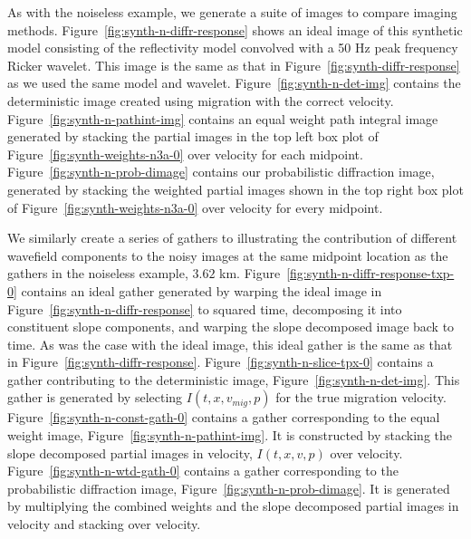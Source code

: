 As with the noiseless example, we generate a suite of images to compare imaging methods.  Figure~\ref{fig:synth-n-diffr-response} shows an ideal image of this synthetic model consisting of the reflectivity model convolved with a 50 Hz peak frequency Ricker wavelet.  This image is the same as that in Figure~\ref{fig:synth-diffr-response} as we used the same model and wavelet.  Figure~\ref{fig:synth-n-det-img} contains the deterministic image created using migration with the correct velocity. Figure~\ref{fig:synth-n-pathint-img} contains  an equal weight path integral image generated by stacking the partial images in the top left box plot of Figure~\ref{fig:synth-weights-n3a-0} over velocity for each midpoint.   Figure~\ref{fig:synth-n-prob-dimage} contains our probabilistic diffraction image, generated by stacking the weighted partial images shown in the top right box plot of Figure~\ref{fig:synth-weights-n3a-0} over velocity for every midpoint. 

We similarly create a series of gathers to illustrating the contribution of different wavefield components to the noisy images at the same midpoint location as the gathers in the noiseless example, $3.62$ km.   Figure~\ref{fig:synth-n-diffr-response-txp-0} contains an ideal gather generated by warping the ideal image in Figure~\ref{fig:synth-n-diffr-response} to squared time, decomposing it into constituent slope components, and warping the slope decomposed image back to time.  As was the case with the ideal image, this ideal gather is the same as that in Figure~\ref{fig:synth-diffr-response}. Figure~\ref{fig:synth-n-slice-tpx-0} contains a gather contributing to the deterministic image, Figure~\ref{fig:synth-n-det-img}. This gather is generated by selecting $I\left(t,x,v_{mig},p\right)$  for the true migration velocity.  Figure~\ref{fig:synth-n-const-gath-0} contains a gather corresponding to the equal weight image, Figure~\ref{fig:synth-n-pathint-img}.  It is constructed by stacking the slope decomposed partial images in velocity, $I\left(t,x,v,p\right)$  over velocity.  Figure~\ref{fig:synth-n-wtd-gath-0} contains a gather corresponding to the probabilistic diffraction image, Figure~\ref{fig:synth-n-prob-dimage}.  It is generated by multiplying the combined weights and the slope decomposed partial images in velocity and stacking over velocity.




